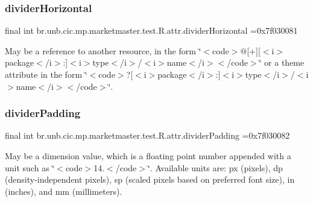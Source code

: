 \subsubsection{\texorpdfstring{divider\+Horizontal}{dividerHorizontal}}
{\footnotesize\ttfamily final int br.\+unb.\+cic.\+mp.\+marketmaster.\+test.\+R.\+attr.\+divider\+Horizontal =0x7f030081\hspace{0.3cm}{\ttfamily [static]}}

May be a reference to another resource, in the form \char`\"{}$<$code$>$@\mbox{[}+\mbox{]}\mbox{[}$<$i$>$package$<$/i$>$\+:\mbox{]}$<$i$>$type$<$/i$>$/$<$i$>$name$<$/i$>$$<$/code$>$\char`\"{} or a theme attribute in the form \char`\"{}$<$code$>$?\mbox{[}$<$i$>$package$<$/i$>$\+:\mbox{]}$<$i$>$type$<$/i$>$/$<$i$>$name$<$/i$>$$<$/code$>$\char`\"{}. \mbox{\label{classbr_1_1unb_1_1cic_1_1mp_1_1marketmaster_1_1test_1_1R_1_1attr_a67df975c5c27f0e74881a1e34b97b7f6}} 
\subsubsection{\texorpdfstring{divider\+Padding}{dividerPadding}}
{\footnotesize\ttfamily final int br.\+unb.\+cic.\+mp.\+marketmaster.\+test.\+R.\+attr.\+divider\+Padding =0x7f030082\hspace{0.3cm}{\ttfamily [static]}}

May be a dimension value, which is a floating point number appended with a unit such as \char`\"{}$<$code$>$14.\+5sp$<$/code$>$\char`\"{}. Available units are\+: px (pixels), dp (density-\/independent pixels), sp (scaled pixels based on preferred font size), in (inches), and mm (millimeters). \mbox{\label{classbr_1_1unb_1_1cic_1_1mp_1_1marketmaster_1_1test_1_1R_1_1attr_a99e15f20a43b155a9e27ac16b312016f}} 
